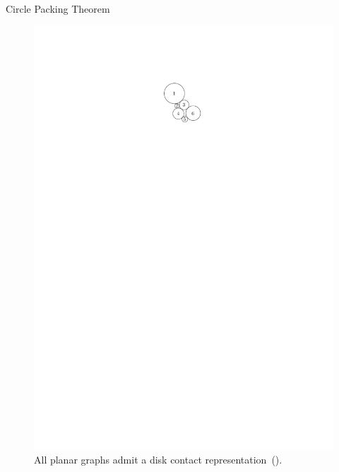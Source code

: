 \documentclass[aspectratio=169,notes]{beamer}
\begin{document}
\begin{frame}{Circle Packing Theorem}

\begin{figure}
    \centering
    \includegraphics{ch1_introduction_2.pdf}
    \caption*{All planar graphs admit a disk contact representation~(\cite{Koebe1936}).}
\end{figure}

\end{frame}
\end{document}
